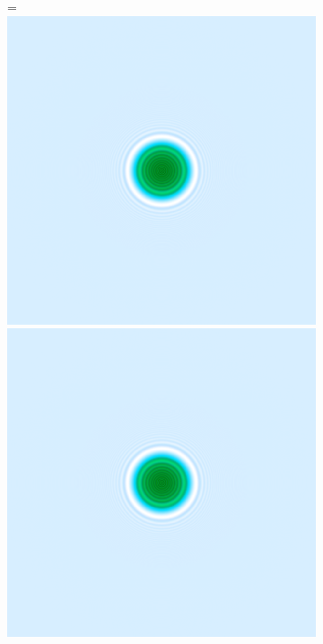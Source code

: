 \begin{figure} %
	\centering
	\begin{subfigure}[b]{0.49\textwidth}
		 =\hbox{\includegraphics[width=\textwidth]{images/fig_sim_exitwave_multislice-r100-bd1e-3.png}}
		  \includegraphics[width=\textwidth]{images/fig_sim_exitwave_multislice-r100-bd1e-3.png}
		  

\end{subfigure}
\end{figure}
